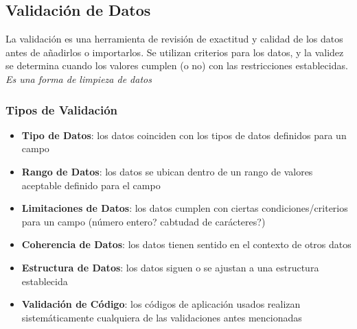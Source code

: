 \subsection{Validación de Datos}
La validación es una herramienta de revisión de exactitud y calidad de los datos antes de añadirlos o importarlos. Se utilizan criterios para los datos, y la validez se determina cuando los valores cumplen (o no) con las restricciones establecidas. \textit{Es una forma de limpieza de datos}

\subsubsection{Tipos de Validación}
\begin{itemize}
    \item {\textbf{Tipo de Datos}: los datos coinciden con los tipos de datos definidos para un campo}
    \item {\textbf{Rango de Datos}: los datos se ubican dentro de un rango de valores aceptable definido para el campo}
    \item {\textbf{Limitaciones de Datos}: los datos cumplen con ciertas condiciones/criterios para un campo (número entero? cabtudad de carácteres?)}
    \item {\textbf{Coherencia de Datos}: los datos tienen sentido en el contexto de otros datos}
    \item {\textbf{Estructura de Datos}: los datos siguen o se ajustan a una estructura establecida}
    \item {\textbf{Validación de Código}: los códigos de aplicación usados realizan sistemáticamente cualquiera de las validaciones antes mencionadas}
\end{itemize}

